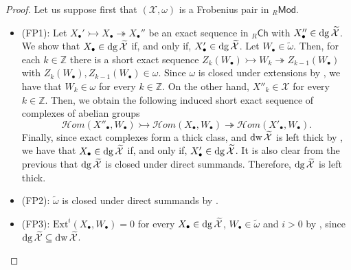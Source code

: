 \documentclass[10pt,reqno]{amsart}
\numberwithin{equation}{section}
\theoremstyle{remark}
\newcommand{\Ext}{\mathrm{Ext}}
\newcommand{\X}{\mathcal{X}}
\begin{document}
 
\begin{proof} Let us suppose first that $(\X, \omega)$ is a Frobenius pair in ${}_R\mathsf{Mod}$.
\begin{itemize}
\item {\sf (FP1)}: Let $X_{\bullet}' \rightarrowtail X_{\bullet} \twoheadrightarrow X_{\bullet}''$ be an exact sequence in ${}_R\mathsf{Ch}$ with $X_{\bullet}'' \in {\rm dg}\,\widetilde{\X}$. We show that $X_{\bullet} \in {\rm dg}\,\widetilde{\X}$ if, and only if, $X_{\bullet}' \in {\rm dg}\,\widetilde{\X}$. Let $W_\bullet \in \widetilde{\omega}$. Then, for each $k \in \mathbb{Z}$ there is a short exact sequence $Z_k(W_\bullet) \rightarrowtail W_k \twoheadrightarrow Z_{k-1}(W_\bullet)$ with $Z_k(W_\bullet), Z_{k-1}(W_\bullet) \in \omega$. Since $\omega$ is closed under extensions by \cite[Prop. 2.7]{BMSP}, we have that $W_k \in \omega$ for every $k \in \mathbb{Z}$. On the other hand, $X''_k \in \X$ for every $k \in \mathbb{Z}$. Then, we obtain the following induced short exact sequence of complexes of abelian groups 
\[
\mathcal{H}om(X''_{\bullet}, W_\bullet) \rightarrowtail \mathcal{H}om(X_{\bullet}, W_\bullet) \twoheadrightarrow \mathcal{H}om(X'_{\bullet}, W_\bullet).
\] 
Finally, since exact complexes form a thick class, and ${\rm dw}\,\widetilde{\X}$ is left thick by \cite[Thm. 3.3]{LiangYangConstructions}, we have that $X_{\bullet} \in {\rm dg}\,\widetilde{\X}$ if, and only if, $X_{\bullet}' \in {\rm dg}\,\widetilde{\X}$. It is also clear from the previous that ${\rm dg}\,\widetilde{\X}$ is closed under direct summands. Therefore, ${\rm dg}\,\widetilde{\X}$ is left thick. 

\item {\sf (FP2)}: $\widetilde{\omega}$ is closed under direct summands by \cite[Thm. 3.3]{LiangYangConstructions}. 

\item {\sf (FP3)}: $\Ext^i(X_\bullet,W_\bullet) = 0$ for every $X_\bullet \in {\rm dg}\,\widetilde{\X}$, $W_\bullet \in \widetilde{\omega}$ and $i > 0$ by \cite[Thm. 3.3]{LiangYangConstructions}, since ${\rm dg}\,\widetilde{\X} \subseteq {\rm dw}\,\widetilde{\X}$.


\end{itemize}
\end{proof}
\end{document}
